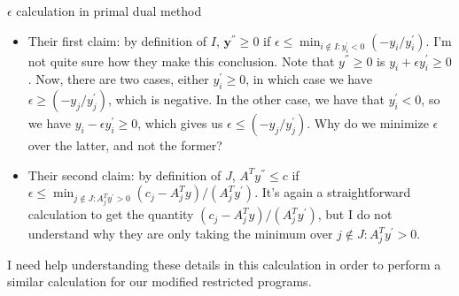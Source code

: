 \documentclass[11pt]{article}
\renewcommand{\'}{^{'}}
\begin{document}
\begin{section}{$\epsilon$ calculation in primal dual method}
\begin{itemize}
		\item Their first claim: by definition of $I$, $\mathbf{y}^{''} \geq 0$ if $\epsilon 
			\leq 
			\min_{i\notin I: y_i^{'} < 0} (-y_i/y_i^{'})$. I'm not quite sure how they 
			make this conclusion. Note that $y^{''}\geq 0$ is 
			$y_i + \epsilon y_i^{'} \geq 0$. Now, there are two cases, either $y_i^{'} 
			\geq 0$, in which case we have $\epsilon \geq (-y_j / y_j^{'})$, which is 
			negative. In the other case, we have that $y_i^{'} < 0$, so we have 
			$y_i - \epsilon y_i^{'} \geq 0$, which gives us $\epsilon \leq (-y_j/y_j^{'})$.
			Why do we minimize $\epsilon$ over the latter, and not the former?
		\item Their second claim: by definition of $J$, $A^{T}y^{''} \leq c$ if 
			$\epsilon \leq \min_{j\notin J: A^{T}_jy^{'} > 0} (c_j - A^{T}_j y)/
			(A^{T}_jy^{'})$. It's again a straightforward calculation to get the quantity
			$(c_j - A^{T}_j y)/(A^{T}_jy^{'})$, but I do not understand why they are 
			only taking the minimum over $j\notin J: A^{T}_jy^{'} > 0$.
	\end{itemize}
	I need help understanding these details in this calculation in order to perform a similar 
	calculation for our modified restricted programs.
\end{section}
\end{document}
